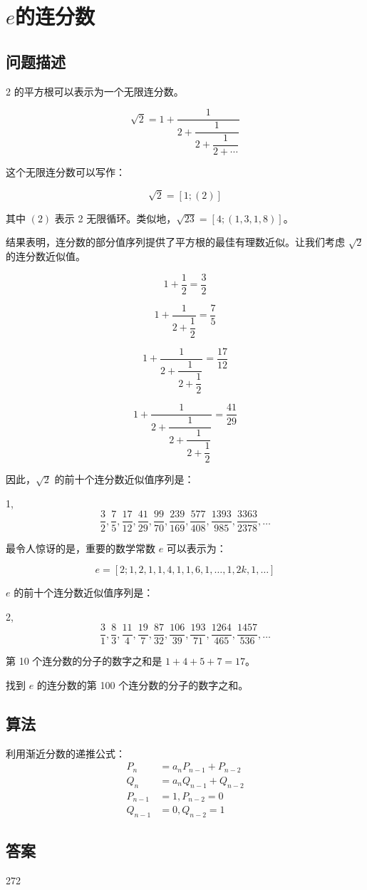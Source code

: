 \section[e的连分数]{$e$的连分数}
\subsection{问题描述}
\begin{tcolorbox}[breakable]

	2 的平方根可以表示为一个无限连分数。

	\[ \sqrt{2} = 1 + \dfrac{1}{2 + \dfrac{1}{2 + \dfrac{1}{2 + \cdots}}} \]

	这个无限连分数可以写作：

	\[ \sqrt{2} = [1; (2)] \]

	其中 \((2)\) 表示 2 无限循环。类似地，\(\sqrt{23} = [4; (1, 3, 1, 8)]\)。

	结果表明，连分数的部分值序列提供了平方根的最佳有理数近似。让我们考虑 \(\sqrt{2}\) 的连分数近似值。

	\[ 1 + \dfrac{1}{2} = \dfrac{3}{2} \]

	\[ 1 + \dfrac{1}{2 + \dfrac{1}{2}} = \dfrac{7}{5} \]

	\[ 1 + \dfrac{1}{2 + \dfrac{1}{2 + \dfrac{1}{2}}} = \dfrac{17}{12} \]

	\[ 1 + \dfrac{1}{2 + \dfrac{1}{2 + \dfrac{1}{2 + \dfrac{1}{2}}}} = \dfrac{41}{29} \]

	因此，\(\sqrt{2}\) 的前十个连分数近似值序列是：

	1,
	\[ \dfrac{3}{2}, \dfrac{7}{5}, \dfrac{17}{12}, \dfrac{41}{29}, \dfrac{99}{70}, \dfrac{239}{169}, \dfrac{577}{408}, \dfrac{1393}{985}, \dfrac{3363}{2378}, \ldots \]

	最令人惊讶的是，重要的数学常数 \( e \) 可以表示为：

	\[ e = [2; 1, 2, 1, 1, 4, 1, 1, 6, 1, \ldots, 1, 2k, 1, \ldots] \]

	\( e \) 的前十个连分数近似值序列是：

	2,
	\[ \dfrac{3}{1}, \dfrac{8}{3}, \dfrac{11}{4}, \dfrac{19}{7}, \dfrac{87}{32}, \dfrac{106}{39}, \dfrac{193}{71}, \dfrac{1264}{465}, \dfrac{1457}{536}, \ldots \]

	第 10 个连分数的分子的数字之和是 \(1 + 4 + 5 + 7 = 17\)。

	找到 \( e \) 的连分数的第 100 个连分数的分子的数字之和。
\end{tcolorbox}

\subsection{算法}
利用渐近分数的递推公式：
\begin{align*}
	P_n     & = a_nP_{n-1} + P_{n-2} \\
	Q_n     & = a_nQ_{n-1} + Q_{n-2} \\
	P_{n-1} & = 1, P_{n-2} = 0       \\
	Q_{n-1} & = 0, Q_{n-2} = 1
\end{align*}

\subsection{答案}
272
